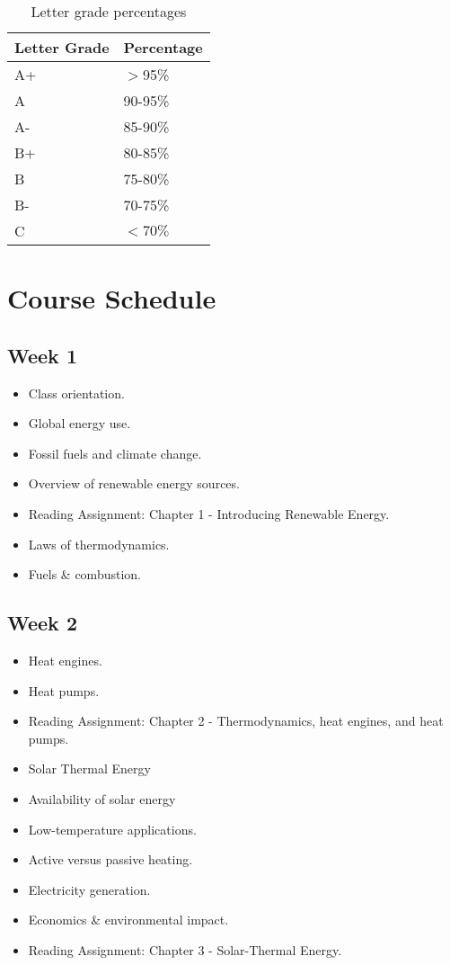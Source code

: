 \documentclass[11pt]{article}
\begin{document}
	\begin{table}[h!]
	    \centering
	    \begin{tabular}{|l|l|}
	         	\hline\hline
	Letter Grade	& Percentage		\\
		\hline\hline  
		A+	& $>$95\%	\\
		A	& 90-95\%	\\
		A-	& 85-90\%	\\
		B+	& 80-85\%	\\
		B & 75-80\%\\
		B-& 70-75\%\\
		C&$<70\%$\\
		\hline\hline
	    \end{tabular}
	    \caption{Letter grade percentages}
	    \label{tab:grades2}
	\end{table}
	
	\newpage
	\section{Course Schedule}
	\subsection*{Week 1}
	\begin{itemize}
	    \item Class orientation.
	    \item Global energy use.
	    \item Fossil fuels and climate change.
	    \item Overview of renewable energy sources.
	    \item Reading Assignment: Chapter 1 - Introducing Renewable Energy.
	 \item Laws of thermodynamics.
	    \item Fuels \& combustion.
	\end{itemize}
	\subsection*{Week 2}
	\begin{itemize}
	 \item Heat engines.
	    \item Heat pumps.
	    \item Reading Assignment: Chapter 2 - Thermodynamics, heat engines, and heat pumps.
		 \item Solar Thermal Energy
	    \item Availability of solar energy
	    \item Low-temperature applications.
	    \item Active versus passive heating.
	    \item Electricity generation.
	    \item Economics \& environmental impact.
	    \item Reading Assignment: Chapter 3 - Solar-Thermal Energy.
	    \end{itemize}
\end{document}
